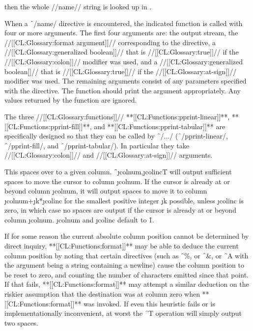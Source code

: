 then the whole //name// string is looked up in . 

When a \f{~/name/} directive is encountered,
the indicated function is called with four or more arguments.
The first four arguments are:
     the output stream,
     the //[[CL:Glossary:format argument]]// corresponding to the directive,
     a //[[CL:Glossary:generalized boolean]]// that is //[[CL:Glossary:true]]// if the //[[CL:Glossary:colon]]// modifier was used,
 and a //[[CL:Glossary:generalized boolean]]// that is //[[CL:Glossary:true]]// if the //[[CL:Glossary:at-sign]]// modifier was used.
The remaining arguments consist of any parameters specified with the directive.
The function should print the argument appropriately.
Any values returned by the function are ignored.
 
The three //[[CL:Glossary:functions]]// 
      **[[CL:Functions:pprint-linear]]**,
      **[[CL:Functions:pprint-fill]]**,
  and **[[CL:Functions:pprint-tabular]]**
are specifically designed so that they can be called by \f{~/.../}
(\ie \f{~/pprint-linear/}, \f{~/pprint-fill/}, and \f{~/pprint-tabular/}).
In particular they take //[[CL:Glossary:colon]]// and //[[CL:Glossary:at-sign]]// arguments.



\endsubsubsection%

\endsubsection%





This spaces over to a given column.
\f{~\j{colnum},\j{colinc}T} will output
sufficient spaces to move the cursor to column \j{colnum}.  If the cursor
is already at or beyond column \j{colnum}, it will output spaces to move it to
column \j{colnum}+\j{k}*\j{colinc} for the smallest positive integer
\j{k} possible, unless \j{colinc} is zero, in which case no spaces
are output if the cursor is already at or beyond column \j{colnum}.
\j{colnum} and \j{colinc} default to \f{1}.


If for some reason the current absolute column position cannot be determined
by direct inquiry,
**[[CL:Functions:format]]** 
may be able to deduce the current column position by noting         
that certain directives (such as \f{~\%}, or \f{~\&},
or \f{~A} 
with the argument being a string containing a newline) cause
the column position to be reset to zero, and counting the number of characters
emitted since that point.  If that fails, **[[CL:Functions:format]]** 
may attempt a
similar deduction on the riskier assumption that the destination was
at column zero when **[[CL:Functions:format]]** 
was invoked.  If even this heuristic fails
or is implementationally inconvenient, at worst
the \f{~T} operation will simply output two spaces.


